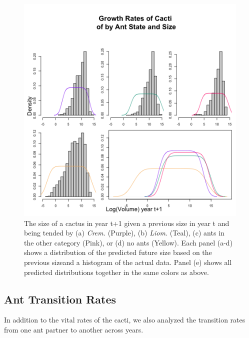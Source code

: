 \documentclass[12pt,a4paper]{article}
\begin{document}
\begin{figure}[!ht]
	\centering
	\includegraphics{Figures/grow_dist_panel2.png}
	\caption{The size of a cactus in year t+1 given a previous size in year t and being tended by (a) \textit{Crem.} (Purple), (b) \textit{Liom.} (Teal), (c) ants in the other category (Pink), or (d) no ants (Yellow). Each panel (a-d) shows a distribution of the predicted future size based on the previous sizeand a histogram of the actual data. Panel (e) shows all predicted distributions together in the same colors as above.}
	\label{fig:grow2}
\end{figure}

	\subsection*{Ant Transition Rates}

In addition to the vital rates of the cacti, we also analyzed the transition rates from one ant partner to another across years. 
\end{document}
